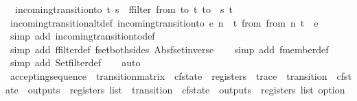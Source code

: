 \begin{isabellebody}
\ \ {\isachardoublequoteopen}incoming{\isacharunderscore}transition{\isacharunderscore}to\ t\ s\ {\isacharequal}\ {\isacharparenleft}{\isacharparenleft}ffilter\ {\isacharparenleft}{\isasymlambda}{\isacharparenleft}{\isacharparenleft}from{\isacharcomma}\ to{\isacharparenright}{\isacharcomma}\ t{\isacharparenright}{\isachardot}\ to\ {\isacharequal}\ s{\isacharparenright}\ t{\isacharparenright}\ {\isasymnoteq}\ {\isacharbraceleft}{\isacharbar}{\isacharbar}{\isacharbraceright}{\isacharparenright}{\isachardoublequoteclose}\isanewline
\isanewline
{}\isamarkupfalse%
\ incoming{\isacharunderscore}transition{\isacharunderscore}alt{\isacharunderscore}def{\isacharcolon}\ {\isachardoublequoteopen}incoming{\isacharunderscore}transition{\isacharunderscore}to\ e\ n\ {\isacharequal}\ {\isacharparenleft}{\isasymexists}t\ from{\isachardot}\ {\isacharparenleft}{\isacharparenleft}from{\isacharcomma}\ n{\isacharparenright}{\isacharcomma}\ t{\isacharparenright}\ {\isacharbar}{\isasymin}{\isacharbar}\ e{\isacharparenright}{\isachardoublequoteclose}\isanewline
%
\isadelimproof
\ \ %
\endisadelimproof
%
\isatagproof
{}\isamarkupfalse%
\ {\isacharparenleft}simp\ add{\isacharcolon}\ incoming{\isacharunderscore}transition{\isacharunderscore}to{\isacharunderscore}def{\isacharparenright}\isanewline
\ \ \isamarkupfalse%
\ {\isacharparenleft}simp\ add{\isacharcolon}\ ffilter{\isacharunderscore}def\ fset{\isacharunderscore}both{\isacharunderscore}sides\ Abs{\isacharunderscore}fset{\isacharunderscore}inverse{\isacharparenright}\isanewline
\ \ \isamarkupfalse%
\ {\isacharparenleft}simp\ add{\isacharcolon}\ fmember{\isacharunderscore}def{\isacharparenright}\isanewline
\ \ \isamarkupfalse%
\ {\isacharparenleft}simp\ add{\isacharcolon}\ Set{\isachardot}filter{\isacharunderscore}def{\isacharparenright}\isanewline
\ \ \isamarkupfalse%
\ auto%
\endisatagproof
{\isafoldproof}%
%
\isadelimproof
\isanewline
%
\endisadelimproof
\isanewline
{}\isamarkupfalse%
\ accepting{\isacharunderscore}sequence\ {\isacharcolon}{\isacharcolon}\ {\isachardoublequoteopen}transition{\isacharunderscore}matrix\ {\isasymRightarrow}\ cfstate\ {\isasymRightarrow}\ registers\ {\isasymRightarrow}\ trace\ {\isasymRightarrow}\ {\isacharparenleft}transition\ {\isasymtimes}\ cfstate\ {\isasymtimes}\ outputs\ {\isasymtimes}\ registers{\isacharparenright}\ list\ {\isasymRightarrow}\ {\isacharparenleft}transition\ {\isasymtimes}\ cfstate\ {\isasymtimes}\ outputs\ {\isasymtimes}\ registers{\isacharparenright}\ list\ option{\isachardoublequoteclose}\ \isanewline

\end{isabellebody}
